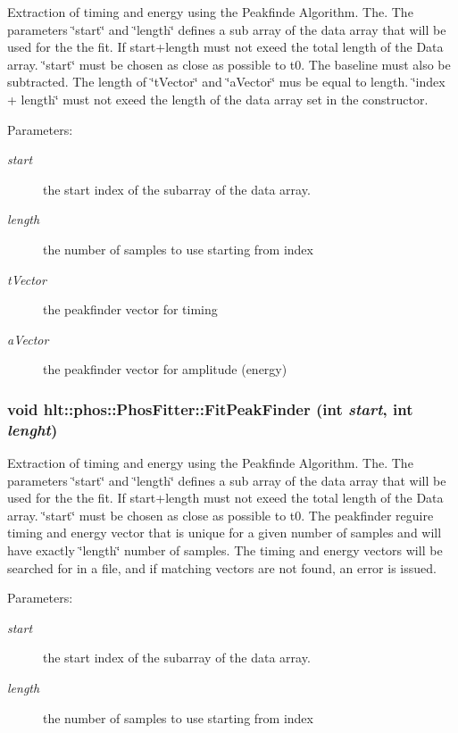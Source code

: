 Extraction of timing and energy using the Peakfinde Algorithm. The. The parameters \char`\"{}start\char`\"{} and \char`\"{}length\char`\"{} defines a sub array of the data array that will be used for the the fit. If start+length must not exeed the total length of the Data array. \char`\"{}start\char`\"{} must be chosen as close as possible to t0. The baseline must also be subtracted. The length of \char`\"{}t\-Vector\char`\"{} and \char`\"{}a\-Vector\char`\"{} mus be equal to length. \char`\"{}index + length\char`\"{} must not exeed the length of the data array set in the constructor. \begin{Desc}
\item[Parameters:]
\begin{description}
\item[{\em start}]the start index of the subarray of the data array. \item[{\em length}]the number of samples to use starting from index \item[{\em t\-Vector}]the peakfinder vector for timing \item[{\em a\-Vector}]the peakfinder vector for amplitude (energy) \end{description}
\end{Desc}
\subsubsection{\setlength{\rightskip}{0pt plus 5cm}void hlt::phos::Phos\-Fitter::Fit\-Peak\-Finder (int {\em start}, int {\em lenght})}\label{classhlt_1_1phos_1_1PhosFitter_a4}


Extraction of timing and energy using the Peakfinde Algorithm. The. The parameters \char`\"{}start\char`\"{} and \char`\"{}length\char`\"{} defines a sub array of the data array that will be used for the the fit. If start+length must not exeed the total length of the Data array. \char`\"{}start\char`\"{} must be chosen as close as possible to t0. The peakfinder reguire timing and energy vector that is unique for a given number of samples and will have exactly \char`\"{}length\char`\"{} number of samples. The timing and energy vectors will be searched for in a file, and if matching vectors are not found, an error is issued. \begin{Desc}
\item[Parameters:]
\begin{description}
\item[{\em start}]the start index of the subarray of the data array. \item[{\em length}]the number of samples to use starting from index \end{description}
\end{Desc}
